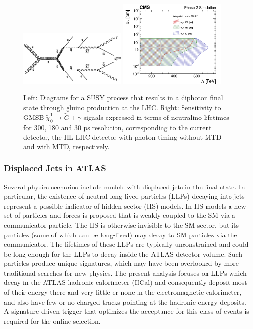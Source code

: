 \begin{figure}[t]\begin{center}
\includegraphics[width=0.47\textwidth]{figures/MTD/diagram.png}
\includegraphics[width=0.47\textwidth]{figures/MTD/Limits_excl_2D_ComparingRes.png}
\caption{ 
Left: Diagrams for a SUSY process that results in a diphoton final state through gluino production at the LHC. 
Right: Sensitivity to GMSB $\tilde{\chi}_0^1 \to \tilde{G} + \gamma$ signals expressed in
terms of neutralino lifetimes for 300, 180 and 30 ps resolution, corresponding to the current
detector, the HL-LHC detector with photon timing without MTD and with MTD, respectively.
}
\label{fig:cmsupgrade_photon}
\end{center}
\end{figure}


\subsubsection{Displaced Jets in ATLAS}

Several physics scenarios include models with displaced jets in the final state.  In particular, the existence of neutral long-lived particles (LLPs) decaying into jets represent a possible indicator of hidden sector (HS) models. In HS models a new set of particles and forces is proposed that is weakly coupled to the SM via a communicator particle. The HS is otherwise invisible to the SM sector, but its particles (some of which can be long-lived) may decay to SM particles via the communicator. The lifetimes of these LLPs are typically unconstrained and could be long enough for the LLPs to decay inside the ATLAS detector volume.
Such particles produce unique signatures, which may have been overlooked by more traditional searches for new physics.
The present analysis focuses on LLPs which decay in the ATLAS hadronic calorimeter (HCal) and consequently deposit most of their energy there and very little or none in the electromagnetic calorimeter, and also have few or no charged tracks pointing at the hadronic energy deposits. A signature-driven trigger that optimizes the acceptance for this class of events is required for the online selection. 

